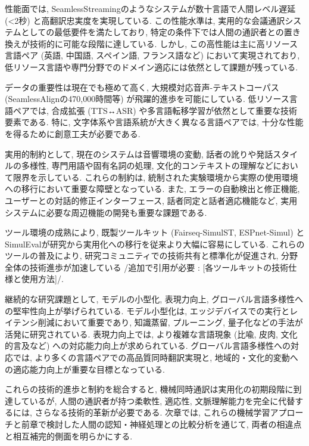 性能面では, SeamlessStreamingのようなシステムが数十言語で人間レベル遅延 (<2秒) と高翻訳忠実度を実現している.
この性能水準は, 実用的な会議通訳システムとしての最低要件を満たしており, 特定の条件下では人間の通訳者との置き換えが技術的に可能な段階に達している.
しかし, この高性能は主に高リソース言語ペア (英語, 中国語, スペイン語, フランス語など) において実現されており, 低リソース言語や専門分野でのドメイン適応には依然として課題が残っている.

データの重要性は現在でも極めて高く, 大規模対応音声-テキストコーパス (SeamlessAlignの470,000時間等) が飛躍的進歩を可能にしている.
低リソース言語ペアでは, 合成拡張 (TTS↔ASR) や多言語転移学習が依然として重要な技術要素である.
特に, 文字体系や言語系統が大きく異なる言語ペアでは, 十分な性能を得るために創意工夫が必要である.

実用的制約として, 現在のシステムは音響環境の変動, 話者の訛りや発話スタイルの多様性, 専門用語や固有名詞の処理, 文化的コンテキストの理解などにおいて限界を示している.
これらの制約は, 統制された実験環境から実際の使用環境への移行において重要な障壁となっている.
また, エラーの自動検出と修正機能, ユーザーとの対話的修正インターフェース, 話者同定と話者適応機能など, 実用システムに必要な周辺機能の開発も重要な課題である.

ツール環境の成熟により, 既製ツールキット (Fairseq-SimulST, ESPnet-Simul) とSimulEvalが研究から実用化への移行を従来より大幅に容易にしている.
これらのツールの普及により, 研究コミュニティでの技術共有と標準化が促進され, 分野全体の技術進歩が加速している {/追加で引用が必要 : [各ツールキットの技術仕様と使用方法]/}.

継続的な研究課題として, モデルの小型化, 表現力向上, グローバル言語多様性への堅牢性向上が挙げられている.
モデル小型化は, エッジデバイスでの実行とレイテンシ削減において重要であり, 知識蒸留, プルーニング, 量子化などの手法が活発に研究されている.
表現力向上では, より複雑な言語現象 (比喩, 皮肉, 文化的言及など) への対応能力向上が求められている.
グローバル言語多様性への対応では, より多くの言語ペアでの高品質同時翻訳実現と, 地域的・文化的変動への適応能力向上が重要な目標となっている.

これらの技術的進歩と制約を総合すると, 機械同時通訳は実用化の初期段階に到達しているが, 人間の通訳者が持つ柔軟性, 適応性, 文脈理解能力を完全に代替するには, さらなる技術的革新が必要である.
次章では, これらの機械学習アプローチと前章で検討した人間の認知・神経処理との比較分析を通じて, 両者の相違点と相互補完的側面を明らかにする.